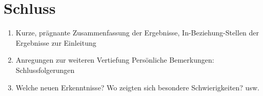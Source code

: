 \chapter{Schluss}\label{chap:schluss}
\begin{enumerate}
	\item Kurze, prägnante Zusammenfassung der Ergebnisse, In-Beziehung-Stellen der Ergebnisse zur Einleitung
	\item Anregungen zur weiteren Vertiefung
Persönliche Bemerkungen: Schlussfolgerungen
	\item Welche neuen Erkenntnisse? Wo zeigten
sich besondere Schwierigkeiten? usw.
\end{enumerate}

\newpage